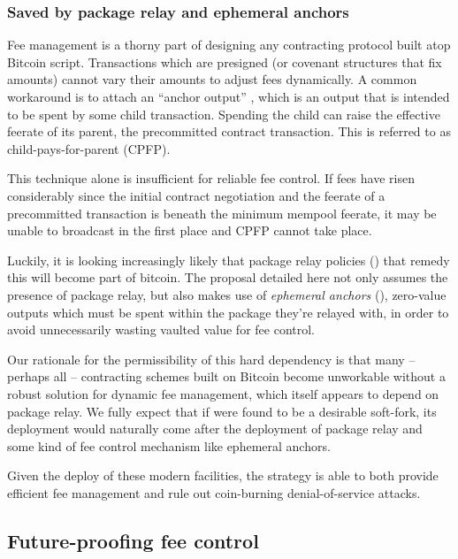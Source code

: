 \documentclass[10pt]{article}
\begin{document}
\subsubsection*{Saved by package relay and ephemeral anchors}

Fee management is a thorny part of designing any contracting protocol built atop
Bitcoin script. Transactions which are presigned (or covenant structures that fix
amounts) cannot vary their amounts to adjust fees dynamically. A common workaround is
to attach an ``anchor output'' \cite{OptechAnchors}, which is an output that is
intended to be spent by some child transaction. Spending the child can raise the
effective feerate of its parent, the precommitted contract transaction. This is
referred to as child-pays-for-parent (CPFP).

This technique alone is insufficient for reliable fee control. If fees have risen
considerably since the initial contract negotiation and the feerate of a precommitted
transaction is beneath the minimum mempool feerate, it may be unable to broadcast in
the first place and CPFP cannot take place.

Luckily, it is looking increasingly likely that package relay policies
(\cite{OptechPkgRelay}) that remedy this will become part of bitcoin. The \opv{}
proposal detailed here not only assumes the presence of package relay, but also makes
use of \emph{ephemeral anchors} (\cite{Anchors}), zero-value outputs which must be 
spent within the package they're relayed with, in order to avoid unnecessarily wasting
vaulted value for fee control.

Our rationale for the permissibility of this hard dependency is that many -- perhaps
all -- contracting schemes built on Bitcoin become unworkable without a robust solution
for dynamic fee management, which itself appears to depend on package relay. We fully
expect that if \opv{} were found to be a desirable soft-fork, its deployment would
naturally come after the deployment of package relay and some kind of fee control
mechanism like ephemeral anchors.

Given the deploy of these modern facilities, the \opv{} strategy is able to both
provide efficient fee management and rule out coin-burning denial-of-service attacks.

\subsection*{Future-proofing fee control}
\end{document}
